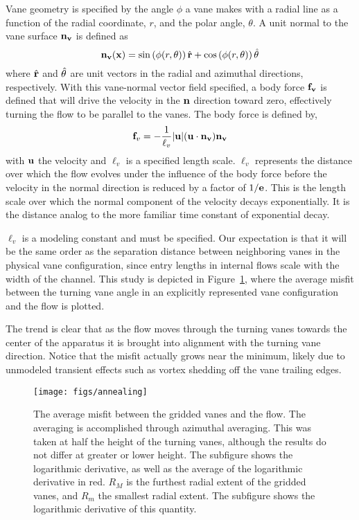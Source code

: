 Vane geometry is specified by the angle $\phi$ a vane makes with a
radial line as a function of the radial coordinate, $r$, and the polar
angle, $\theta$. A unit normal to the vane surface ${\bf n_v}$ is defined
as 
%
\begin{equation}
 {\bf n_v}({\bf x}) = \sin \left(\phi(r,\theta) \right) \hat{{\bf r}}+ \cos
  \left(\phi(r,\theta) \right) \hat{{\bf \theta}} 
\end{equation}
%
where $\hat{{\bf r}}$ and $\hat{{\bf \theta}}$ are unit
vectors in the radial and azimuthal directions, respectively.
With this vane-normal vector field specified, a body force ${\bf f_v}$
is defined that will drive the velocity in the ${\bf n}$ direction
toward zero, effectively turning the flow to be parallel to the
vanes. The body force is defined by,
\begin{equation}
 {\bf f}_v= -\frac{1}{\ell_v}|{\bf u}|({\bf u}\cdot{\bf n_v}){\bf n_v}
 \label{eqn:body_force}
\end{equation}
with ${\bf u}$ the velocity and $\ell_v$ is a specified length
scale. $\ell_v$ represents the distance over which the
flow evolves under the influence of the body force before the
velocity in the normal direction is reduced by a factor of $1/{\bf 
e}$.
This is the length scale over which the normal component of the velocity
decays exponentially. It is the distance analog to the more familiar
time constant of exponential decay. 

$\ell_v$ is a modeling constant and must be specified. Our expectation
is that it will be the same order as the separation distance between
neighboring vanes in the physical vane configuration, since entry 
lengths in internal flows scale with the width of the channel. 
This study is depicted in Figure~\ref{fig:annealing}, where
the average misfit between the turning vane angle in an explicitly
represented vane configuration and the flow is plotted.  

The trend is clear that as the flow moves through the turning vanes
towards the center of the apparatus it is brought into alignment with
the turning vane direction. 
Notice that the misfit actually grows near the minimum, likely due to
unmodeled transient effects such as vortex shedding off the vane
trailing edges. 

   \begin{figure}[!htb]
    \centering
    \texttt{[image: figs/annealing]}
     \caption{The average misfit between the gridded vanes and the
    flow. The averaging is accomplished through azimuthal
    averaging. This was taken at half the height of the turning vanes,
    although the results do not differ at greater or lower height. 
    The subfigure shows the logarithmic derivative, as well as the
    average of the logarithmic derivative in red. 
$R_{M}$ is the furthest radial extent of the gridded vanes,
    and $R_{m}$ the smallest radial extent. The subfigure shows the
    logarithmic derivative of this quantity.}
     \label{fig:annealing}
   \end{figure}



